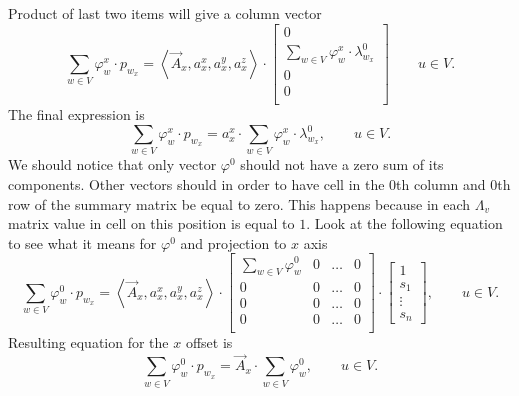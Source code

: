 Product of last two items will give a column vector
\begin{equation*}
  \sum\limits_{w \in V} \varphi_w^x \cdot p_{w_x}
  = \left\langle \vec{A}_x, a_x^x, a_x^y, a_x^z \right\rangle
    \cdot \begin{bmatrix}
      0 \\
      \sum\limits_{w \in V} \varphi_w^x
        \cdot \lambda^0_{w_x}               \\
      0                                     \\
      0                                     \\
    \end{bmatrix}
  \qquad u \in V.
\end{equation*}
The final expression is
\begin{equation*}
  \sum\limits_{w \in V} \varphi_w^x \cdot p_{w_x}
  = a_x^x \cdot \sum\limits_{w \in V} \varphi_w^x \cdot \lambda^0_{w_x},
  \qquad u \in V.
\end{equation*}
We should notice that only vector $\varphi^0$
should not have a zero sum of its components.
Other vectors should in order to have cell in the $0$th column and $0$th row
of the summary matrix be equal to zero.
This happens because in each $\Lambda_v$ matrix value in cell on this position
is equal to $1$.
Look at the following equation to see what it means for $\varphi^0$
and projection to $x$ axis
\begin{equation*}
  \sum\limits_{w \in V} \varphi_w^0 \cdot p_{w_x}
  = \left\langle \vec{A}_x, a_x^x, a_x^y, a_x^z \right\rangle
    \cdot \begin{bmatrix}
      \sum\limits_{w \in V} \varphi_w^0 & 0 & \dots & 0 \\
      0                                 & 0 & \dots   & 0 \\
      0                                 & 0 & \dots & 0 \\
      0                                 & 0 & \dots & 0 \\
    \end{bmatrix}
    \cdot \begin{bmatrix}
      1 \\
      s_1 \\
      \vdots \\
      s_n
    \end{bmatrix},
  \qquad u \in V.
\end{equation*}
Resulting equation for the $x$ offset is
\begin{equation*}
  \sum\limits_{w \in V} \varphi_w^0 \cdot p_{w_x}
  = \vec{A}_x \cdot \sum\limits_{w \in V} \varphi_w^0,
  \qquad u \in V.
\end{equation*}

